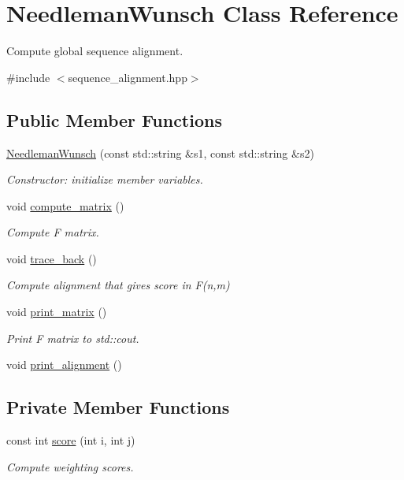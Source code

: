 \hypertarget{class_needleman_wunsch}{\section{Needleman\+Wunsch Class Reference}
\label{class_needleman_wunsch}
}


Compute global sequence alignment.  




{\ttfamily \#include $<$sequence\+\_\+alignment.\+hpp$>$}

\subsection*{Public Member Functions}
\begin{DoxyCompactItemize}
\item 
\hyperlink{class_needleman_wunsch_aeae3f49e2d098cc38502f1120ce51125}{Needleman\+Wunsch} (const std\+::string \&s1, const std\+::string \&s2)
\begin{DoxyCompactList}\small\item\em Constructor\+: initialize member variables. \end{DoxyCompactList}\item 
void \hyperlink{class_needleman_wunsch_ab9d49487c7d5842605ee5a63618ed2b4}{compute\+\_\+matrix} ()
\begin{DoxyCompactList}\small\item\em Compute F matrix. \end{DoxyCompactList}\item 
void \hyperlink{class_needleman_wunsch_a8c2eb166792cb7df48d874389d359050}{trace\+\_\+back} ()
\begin{DoxyCompactList}\small\item\em Compute alignment that gives score in F(n,m) \end{DoxyCompactList}\item 
void \hyperlink{class_needleman_wunsch_aac43629688e294d9f5506c7fe21d5057}{print\+\_\+matrix} ()
\begin{DoxyCompactList}\small\item\em Print F matrix to std\+::cout. \end{DoxyCompactList}\item 
void \hyperlink{class_needleman_wunsch_ace01855dc95b71305e6551126dba0f66}{print\+\_\+alignment} ()
\end{DoxyCompactItemize}
\subsection*{Private Member Functions}
\begin{DoxyCompactItemize}
\item 
const int \hyperlink{class_needleman_wunsch_ab9c9f2364cc38cb97d7b4f8dca2ca228}{score} (int i, int j)
\begin{DoxyCompactList}\small\item\em Compute weighting scores. \end{DoxyCompactList}\end{DoxyCompactItemize}
